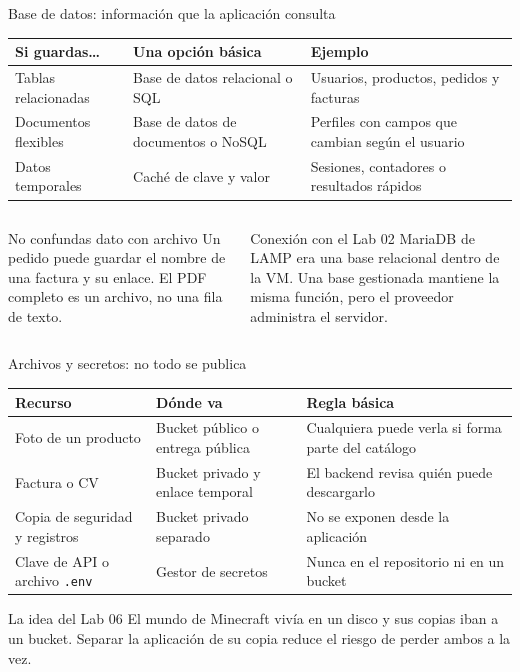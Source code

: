 \documentclass[aspectratio=169,10pt,c]{beamer}
\begin{document}
\begin{frame}{Base de datos: información que la aplicación consulta}
\renewcommand{\arraystretch}{1.32}
\centering\small
\begin{tabular}{@{}p{3.3cm}p{4.7cm}p{4.3cm}@{}}
\toprule
\textbf{Si guardas\ldots} & \textbf{Una opción básica} & \textbf{Ejemplo}\\
\midrule
Tablas relacionadas & Base de datos relacional o SQL & Usuarios, productos, pedidos y facturas\\
Documentos flexibles & Base de datos de documentos o NoSQL & Perfiles con campos que cambian según el usuario\\
Datos temporales & Caché de clave y valor & Sesiones, contadores o resultados rápidos\\
\bottomrule
\end{tabular}
\par\vspace{3mm}
\begin{columns}[T,onlytextwidth]
\begin{block}{No confundas dato con archivo}
\small Un pedido puede guardar el nombre de una factura y su enlace. El PDF completo es un archivo, no una fila de texto.
\end{block}
\begin{alertblock}{Conexión con el Lab 02}
\small MariaDB de LAMP era una base relacional dentro de la VM. Una base gestionada mantiene la misma función, pero el proveedor administra el servidor.
\end{alertblock}
\end{columns}
\end{frame}

\begin{frame}{Archivos y secretos: no todo se publica}
\renewcommand{\arraystretch}{1.35}
\centering\small
\begin{tabular}{@{}p{3.3cm}p{4.1cm}p{4.9cm}@{}}
\toprule
\textbf{Recurso} & \textbf{Dónde va} & \textbf{Regla básica}\\
\midrule
Foto de un producto & Bucket público o entrega pública & Cualquiera puede verla si forma parte del catálogo\\
Factura o CV & Bucket privado y enlace temporal & El backend revisa quién puede descargarlo\\
Copia de seguridad y registros & Bucket privado separado & No se exponen desde la aplicación\\
Clave de API o archivo \texttt{.env} & Gestor de secretos & Nunca en el repositorio ni en un bucket\\
\bottomrule
\end{tabular}
\par\vspace{3mm}
\begin{alertblock}{La idea del Lab 06}
\small El mundo de Minecraft vivía en un disco y sus copias iban a un bucket. Separar la aplicación de su copia reduce el riesgo de perder ambos a la vez.
\end{alertblock}
\end{frame}
\end{document}
